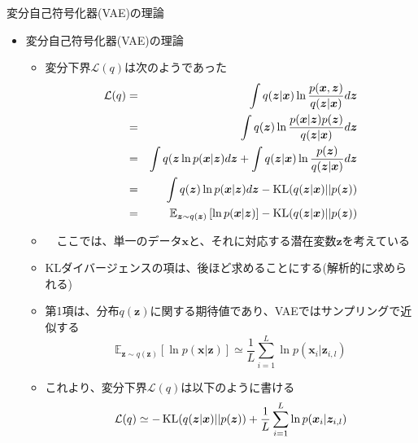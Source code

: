 \documentclass[dvipdfmx,notheorems,t]{beamer}
\begin{document}
\begin{frame}{変分自己符号化器(VAE)の理論}

\begin{itemize}
	\item 変分自己符号化器(VAE)の理論
	\begin{itemize}
		\item 変分下界$\mathcal{L}(q)$は次のようであった
		\begin{eqnarray}
			\mathcal{L}(q) &=& \int q(\bm{z} | \bm{x}) \ln \frac{p(\bm{x}, \bm{z})}{q(\bm{z} | \bm{x})} d\bm{z} \\
			&=& \int q(\bm{z}) \ln \frac{p(\bm{x} | \bm{z}) p(\bm{z})}{q(\bm{z} | \bm{x})} d\bm{z} \\
			&=& \int q(\bm{z} \ln p(\bm{x} | \bm{z}) d\bm{z} + \int q(\bm{z} | \bm{x}) \ln \frac{p(\bm{z})}{q(\bm{z} | \bm{x})} d\bm{z} \\
			&=& \int q(\bm{z}) \ln p(\bm{x} | \bm{z}) d\bm{z} - \operatorname{KL}(q(\bm{z} | \bm{x}) || p(\bm{z})) \\
			&=& \mathbb{E}_{\bm{z} \sim q(\bm{z})} \left[ \ln p(\bm{x} | \bm{z}) \right] - \operatorname{KL}(q(\bm{z} | \bm{x}) || p(\bm{z}))
		\end{eqnarray}
		
		\item　ここでは、単一のデータ$\bm{x}$と、それに対応する潜在変数$\bm{z}$を考えている
		\newline
		
		\item KLダイバージェンスの項は、後ほど求めることにする(解析的に求められる)
		\item 第1項は、分布$q(\bm{z})$に関する期待値であり、VAEでは\alert{サンプリングで近似}する
		\begin{equation}
			\mathbb{E}_{\bm{z} \sim q(\bm{z})} \left[ \ln p(\bm{x} | \bm{z}) \right] \simeq \frac{1}{L} \sum_{i = 1}^L \ln p(\bm{x}_i | \bm{z}_{i, l})
		\end{equation}
		
		\item これより、変分下界$\mathcal{L}(q)$は以下のように書ける
		\begin{equation}
			\mathcal{L}(q) \simeq -\operatorname{KL}(q(\bm{z} | \bm{x}) || p(\bm{z})) + \frac{1}{L} \sum_{i = 1}^L \ln p(\bm{x}_i | \bm{z}_{i, l})
		\end{equation}
	\end{itemize}
\end{itemize}

\end{frame}
\end{document}

